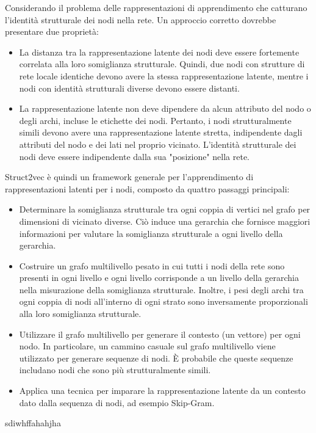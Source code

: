 \documentclass[11pt]{article}
\begin{document}
Considerando il problema delle rappresentazioni di apprendimento che catturano l'identità strutturale dei nodi nella rete. Un approccio corretto dovrebbe presentare due proprietà:
\begin{itemize}
  \item La distanza tra la rappresentazione latente dei nodi deve essere fortemente correlata alla loro somiglianza strutturale. Quindi, due nodi con strutture di rete locale identiche devono avere la stessa rappresentazione latente, mentre i nodi con identità strutturali diverse devono essere distanti.
  \item La rappresentazione latente non deve dipendere da alcun attributo del nodo o degli archi, incluse le etichette dei nodi.
Pertanto, i nodi strutturalmente simili devono avere una rappresentazione latente stretta, indipendente dagli attributi del nodo e dei lati nel proprio vicinato.
L'identità strutturale dei nodi deve essere indipendente dalla sua "posizione" nella rete.
\end{itemize}

Struct2vec è quindi un framework generale per l'apprendimento di rappresentazioni latenti per i nodi, composto da quattro passaggi principali:
\begin{itemize}
  \item Determinare la somiglianza strutturale tra ogni coppia di vertici nel grafo per dimensioni di vicinato diverse.
Ciò induce una gerarchia che fornisce maggiori informazioni per valutare la somiglianza strutturale a ogni livello della gerarchia.
  \item Costruire un grafo multilivello pesato in cui tutti i nodi della rete sono presenti in ogni livello e ogni livello corrisponde a un livello della gerarchia nella misurazione della somiglianza strutturale.
Inoltre, i pesi degli archi tra ogni coppia di nodi all'interno di ogni strato sono inversamente proporzionali alla loro somiglianza strutturale.
  \item Utilizzare il grafo multilivello per generare il contesto (un vettore) per ogni nodo.
In particolare, un cammino casuale sul grafo multilivello viene utilizzato per generare sequenze di nodi. 
È probabile che queste sequenze includano nodi che sono più strutturalmente simili.
  \item Applica una tecnica per imparare la rappresentazione latente da un contesto dato dalla sequenza di nodi, ad esempio Skip-Gram.
\end{itemize}
  
  
sdiwhffahahjha
\end{document}
